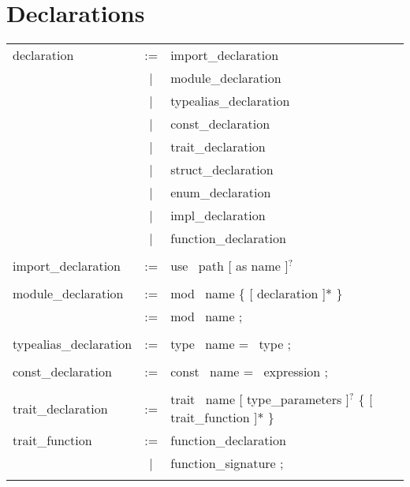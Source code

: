 \documentclass{article}
\begin{document}
\newcommand{\kw}[1]{\color{blue}#1\color{black} \,}

\section*{Declarations}
\begin{table}[H]
    \centering
    \begin{tabular}{lcl}
        declaration & := & import\_declaration \\
                    & | & module\_declaration \\
                    & | & typealias\_declaration \\
                    & | & const\_declaration \\
                    & | & trait\_declaration \\
                    & | & struct\_declaration \\
                    & | & enum\_declaration \\
                    & | & impl\_declaration \\
                    & | & function\_declaration \\ \\

        import\_declaration & := & \kw{use} path [ as name ]$^?$ \\ \\

        module\_declaration & := & \kw{mod} name \{ [ declaration ]* \} \\
                            & := & \kw{mod} name \kw{;} \\ \\

        typealias\_declaration & := & \kw{type} name \kw{=} type \kw{;} \\ \\

        const\_declaration & := & \kw{const} name \kw{=} expression \kw{;} \\ \\
        
        trait\_declaration & := & \kw {trait} name [ type\_parameters ]$^?$ \{ [ trait\_function ]* \} \\
        trait\_function & := & function\_declaration \\
                        & | & function\_signature \kw{;} \\ \\


\end{tabular}
\end{table}
\end{document}

